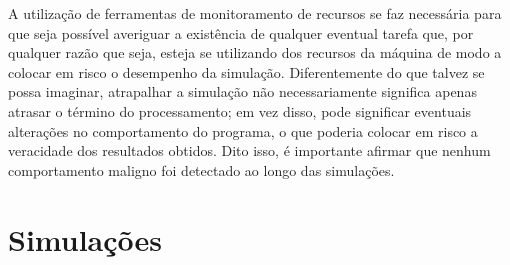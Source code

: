 A utilização de ferramentas de monitoramento de recursos se faz necessária para que seja possível averiguar a existência de qualquer eventual tarefa que, por qualquer razão que seja, esteja se utilizando dos recursos da máquina de modo a colocar em risco o desempenho da simulação. Diferentemente do que talvez se possa imaginar, atrapalhar a simulação não necessariamente significa apenas atrasar o término do processamento; em vez disso, pode significar eventuais alterações no comportamento do programa, o que poderia colocar em risco a veracidade dos resultados obtidos. Dito isso, é importante afirmar que nenhum comportamento maligno foi detectado ao longo das simulações.



\section{Simulações}
\label{sec:results_simulations}


